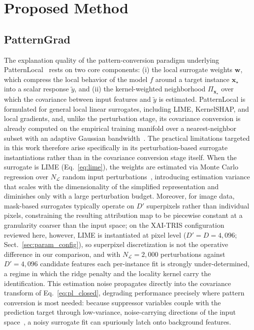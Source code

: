 \documentclass[pdflatex,sn-mathphys-num]{sn-jnl}
\theoremstyle{thmstyleone}
\theoremstyle{thmstyletwo}%
\theoremstyle{thmstylethree}%
\begin{document}
\section{Proposed Method}\label{sec:proposed}

\subsection{PatternGrad}
The explanation quality of the pattern-conversion paradigm underlying PatternLocal~\cite{gjoelbye2025} rests on two core components: (i) the local surrogate weights $\mathbf{w}$, which compress the local behavior of the model $f$ around a target instance $\mathbf{x}_\star$ into a scalar response $\tilde{y}$, and (ii) the kernel-weighted neighborhood $\Pi_{\mathbf{x}_\star}$ over which the covariance between input features and $\tilde{y}$ is estimated. PatternLocal is formulated for general local linear surrogates, including LIME, KernelSHAP, and local gradients, and, unlike the perturbation stage, its covariance conversion is already computed on the empirical training manifold over a nearest-neighbor subset with an adaptive Gaussian bandwidth~\cite{gjoelbye2025}. The practical limitations targeted in this work therefore arise specifically in its perturbation-based surrogate instantiations rather than in the covariance conversion stage itself. When the surrogate is LIME (Eq.~\eqref{eq:lime}), the weights are estimated via Monte Carlo regression over $N_{\mathcal{L}}$ random input perturbations~\cite{ribeiro2016,tan2023}, introducing estimation variance that scales with the dimensionality of the simplified representation and diminishes only with a large perturbation budget. Moreover, for image data, mask-based surrogates typically operate on $D'$ superpixels rather than individual pixels, constraining the resulting attribution map to be piecewise constant at a granularity coarser than the input space; on the XAI-TRIS configuration reviewed here, however, LIME is instantiated at pixel level ($D' = D = 4{,}096$; Sect.~\ref{sec:param_config}), so superpixel discretization is not the operative difference in our comparison, and with $N_{\mathcal{L}} = 2{,}000$ perturbations against $D' = 4{,}096$ candidate features each per-instance fit is strongly under-determined, a regime in which the ridge penalty and the locality kernel carry the identification. This estimation noise propagates directly into the covariance transform of Eq.~\eqref{eq:pl_closed}, degrading performance precisely where pattern conversion is most needed: because suppressor variables couple with the prediction target through low-variance, noise-carrying directions of the input space~\cite{haufe2014,wilming2022}, a noisy surrogate fit can spuriously latch onto background features.
\end{document}
